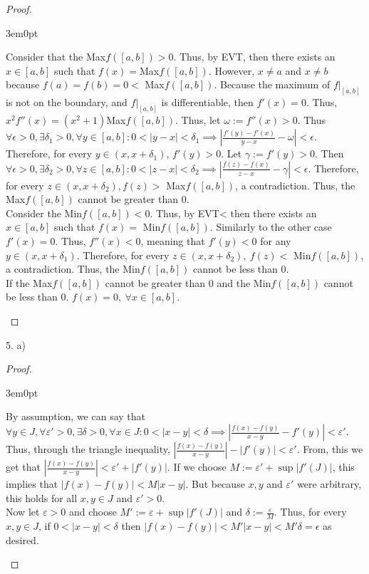 \documentclass[11pt]{article}
\newenvironment{myproof}
{\begin{proof} \begin{adjustwidth}{3em}{0pt}$ $\par\nobreak\ignorespaces}
{\end{adjustwidth} \end{proof}}
\begin{document}
\begin{flushleft}
\begin{myproof}
Consider that the Max$f([a,b]) > 0$. Thus, by EVT, then there exists an $x \in [a,b]$ such that $f(x) = $Max$f([a,b])$. However, $x \neq a$ and $x \neq b$ because $f(a) = f(b) = 0 < $ Max$f([a,b])$. Because the maximum of $f|_{[a,b]}$ is not on the boundary, and $f|_{[a,b]}$ is differentiable, then $f'(x) = 0$. Thus, $x^2f''(x) = (x^2+1)$Max$f([a,b])$. Thus, let $\omega := f''(x)>0$. Thus $\forall \epsilon > 0, \exists \delta_1 > 0, \forall y \in [a,b]: 0<|y-x|<\delta_1 \implies |\frac{f'(y)-f'(x)}{y-x}-\omega|<\epsilon$. Therefore, for every $y \in (x,x+\delta_1)$, $f'(y) > 0$. Let $\gamma := f'(y) > 0$. Then
$\forall \epsilon > 0, \exists \delta_2 > 0, \forall z \in [a,b]: 0<|z-x|<\delta_2 \implies |\frac{f(z)-f(x)}{z-x}-\gamma|<\epsilon$. Therefore, for every $z \in (x,x+\delta_2), f(z) > $ Max$f([a,b])$, a contradiction. Thus, the Max$f([a,b])$ cannot be greater than 0. \\
\bigskip
Consider the Min$f([a,b]) < 0$. Thus, by EVT< then there exists an $x \in [a,b]$ such that $f(x) = $ Min$f([a,b])$. Similarly to the other case $f'(x) = 0$. Thus, $f''(x) < 0$, meaning that $f'(y) < 0$ for any $y \in (x,x+\delta_1)$. Therefore, for every $z \in (x,x+\delta_2), \ f(z) < $ Min$f([a,b])$, a contradiction. Thus, the Min$f([a,b])$ cannot be less than 0. \\
\bigskip
If the Max$f([a,b])$ cannot be greater than 0 and the Min$f([a,b])$ cannot be less than 0. $f(x) = 0, \ \forall x \in [a,b]$.

\end{myproof}

\newpage

5. a)

\begin{myproof}

By assumption, we can say that $\forall y \in J,\forall \varepsilon' > 0, \exists \delta > 0, \forall x \in J:0<|x-y|<\delta \implies |\frac{f(x)-f(y)}{x-y}-f'(y)| < \varepsilon'$. Thus, through the triangle inequality, $|\frac{f(x)-f(y)}{x-y}|-|f'(y)| < \varepsilon'$. From, this we get that $|\frac{f(x)-f(y)}{x-y}| < \varepsilon' + |f'(y)|$. If we choose $M := \varepsilon' + \sup |f'(J)|$, this implies that $|f(x)-f(y)| < M|x-y|$. But because $x,y$ and $\varepsilon'$ were arbitrary, this holds for all $x,y \in J$ and $\varepsilon' > 0$. \\
\bigskip
Now let $\varepsilon >0$ and choose $M' := \varepsilon + \sup |f'(J)|$ and $\delta := \frac{\varepsilon}{M}$. Thus, for every $x,y \in J$, if $0<|x-y|<\delta$ then $|f(x)-f(y)| < M'|x-y| < M'\delta = \epsilon$ as desired.


\end{myproof}
\end{flushleft}
\end{document}
